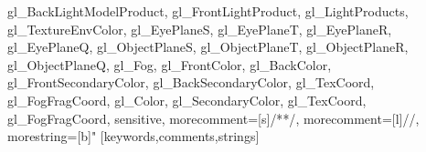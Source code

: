 {{                    gl_BackLightModelProduct,%
                    gl_FrontLightProduct,%
                    gl_LightProducts,%
                    gl_TextureEnvColor,%
                    gl_EyePlaneS,%
                    gl_EyePlaneT,%
                    gl_EyePlaneR,%
                    gl_EyePlaneQ,%
                    gl_ObjectPlaneS,%
                    gl_ObjectPlaneT,%
                    gl_ObjectPlaneR,%
                    gl_ObjectPlaneQ,%
                    gl_Fog,%
                    gl_FrontColor,%
                    gl_BackColor,%
                    gl_FrontSecondaryColor,%
                    gl_BackSecondaryColor,%
                    gl_TexCoord,%
                    gl_FogFragCoord,%
                    gl_Color,%
                    gl_SecondaryColor,%
                    gl_TexCoord,%
                    gl_FogFragCoord},%
    sensitive,%
    morecomment=[s]{/*}{*/},%
    morecomment=[l]//,%
    morestring=[b]"
    }[keywords,comments,strings]%

